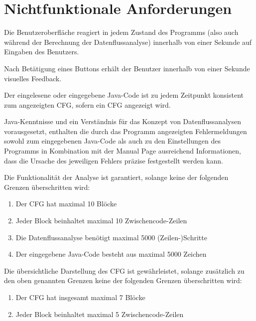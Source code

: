 
\section{Nichtfunktionale Anforderungen}


Die Benutzeroberfläche reagiert in jedem Zustand des Programms (also auch während der Berechnung der Datenflussanalyse) innerhalb von einer Sekunde auf Eingaben des Benutzers.


Nach Betätigung eines Buttons erhält der Benutzer innerhalb von einer Sekunde visuelles Feedback.


Der eingelesene oder eingegebene Java-Code ist zu jedem Zeitpunkt konsistent zum angezeigten CFG, sofern ein CFG angezeigt wird.


Java-Kenntnisse und ein Verständnis für das Konzept von Datenflussanalysen vorausgesetzt, enthalten die durch das Programm angezeigten Fehlermeldungen sowohl zum eingegebenen Java-Code als auch zu den Einstellungen des Programms in Kombination mit der Manual Page ausreichend Informationen, dass die Ursache des jeweiligen Fehlers präzise festgestellt werden kann.


Die Funktionalität der Analyse ist garantiert, solange keine der folgenden Grenzen überschritten wird:
\begin{enumerate}[label=(\alph*)]
\item Der CFG hat maximal 10 Blöcke
\item Jeder Block beinhaltet maximal 10 Zwischencode-Zeilen
\item Die Datenflussanalyse benötigt maximal 5000 (Zeilen-)Schritte
\item Der eingegebene Java-Code besteht aus maximal 5000 Zeichen
\end{enumerate}

Die übersichtliche Darstellung des CFG ist gewährleistet, solange zusätzlich zu den oben genannten Grenzen keine der folgenden Grenzen überschritten wird:
\begin{enumerate}[label=(\alph*)]
\item Der CFG hat insgesamt maximal 7 Blöcke
\item Jeder Block beinhaltet maximal 5 Zwischencode-Zeilen
\end{enumerate}


